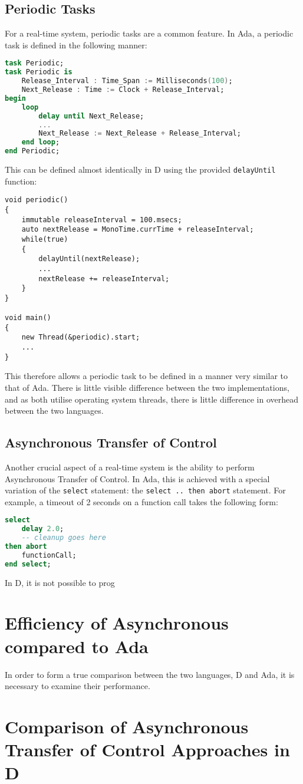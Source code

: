 \subsection{Periodic Tasks}
For a real-time system, periodic tasks are a common feature. In Ada, a periodic
task is defined in the following manner: 
\begin{lstlisting}[language=Ada]
task Periodic; 
task Periodic is 
    Release_Interval : Time_Span := Milliseconds(100); 
    Next_Release : Time := Clock + Release_Interval; 
begin
    loop 
        delay until Next_Release; 
        ... 
        Next_Release := Next_Release + Release_Interval; 
    end loop; 
end Periodic; 
\end{lstlisting}
This can be defined almost identically in D using the provided
\texttt{delayUntil} function: 
\begin{lstlisting}
void periodic()
{
    immutable releaseInterval = 100.msecs; 
    auto nextRelease = MonoTime.currTime + releaseInterval; 
    while(true)
    {
        delayUntil(nextRelease); 
        ...
        nextRelease += releaseInterval; 
    }
}

void main()
{
    new Thread(&periodic).start; 
    ...
}
\end{lstlisting}
This therefore allows a periodic task to be defined in a manner very
similar to that of Ada. There is little visible difference between the two
implementations, and as both utilise operating system threads, there is little
difference in overhead between the two languages. 

\subsection{Asynchronous Transfer of Control}
Another crucial aspect of a real-time system is the ability to perform
Asynchronous Transfer of Control. In Ada, this is achieved with a special
variation of the \texttt{select} statement: the \texttt{select .. then abort}
statement. For example, a timeout of 2 seconds on a function call takes the 
following form: 
\begin{lstlisting}[language=Ada]
select 
    delay 2.0; 
    -- cleanup goes here 
then abort
    functionCall; 
end select; 
\end{lstlisting}
In D, it is not possible to prog


\section{Efficiency of Asynchronous compared to Ada}
In order to form a true comparison between the two languages, D and Ada, it is
necessary to examine their performance.

\section{Comparison of Asynchronous Transfer of Control Approaches in D}
